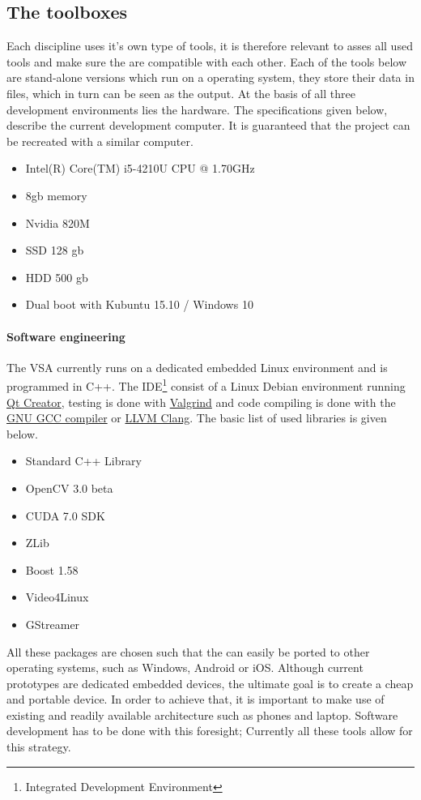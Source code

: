\documentclass[fleqn,10pt]{SelfArx} %
\begin{document}
\subsection{The toolboxes}\label{sec:Toolboxes}
Each discipline uses it's own type of tools, it is therefore relevant to asses all used tools and make sure the are compatible with each other. Each of the tools below are stand-alone versions which run on a operating system, they store their data in files, which in turn can be seen as the output. At the basis of all three development environments lies the hardware. The specifications given below, describe the current development computer. It is guaranteed that the project can be recreated with a similar computer.
\begin{itemize}[noitemsep]
	\item Intel(R) Core(TM) i5-4210U CPU @ 1.70GHz
	\item 8gb memory
	\item Nvidia 820M
	\item SSD 128 gb
	\item HDD 500 gb
	\item Dual boot with Kubuntu 15.10 / Windows 10
\end{itemize}

\paragraph{Software engineering}
The VSA currently runs on a dedicated embedded Linux environment and is programmed in C++. The IDE\footnote{Integrated Development Environment} consist of a Linux Debian environment running \href{http://www.qt.io/}{\color{color1}Qt Creator}, testing is done with \href{http://valgrind.org/}{\color{color1}Valgrind} and code compiling is done with the \href{https://gcc.gnu.org/}{\color{color1}GNU GCC compiler} or \href{http://clang.llvm.org/}{\color{color1}LLVM Clang}.
The basic list of used libraries is given below.
\begin{itemize}[noitemsep]
	\item Standard C++ Library
	\item OpenCV 3.0 beta
	\item CUDA 7.0 SDK
	\item ZLib
	\item Boost 1.58
	\item Video4Linux
	\item GStreamer
\end{itemize}

All these packages are chosen such that the can easily be ported to other operating systems, such as Windows, Android or iOS. Although current prototypes are dedicated embedded devices, the ultimate goal is to create a cheap and portable device. In order to achieve that, it is important to make use of existing and readily available architecture such as phones and laptop. Software development has to be done with this foresight; Currently all these tools allow for this strategy.
\end{document}
